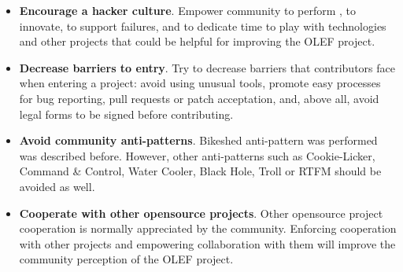 \documentclass[11pt]{article}
\begin{document}
\begin{itemize}
\item{\textbf{Encourage a hacker culture}}. Empower community to perform , to innovate, to support failures, and to dedicate time to play with technologies and other projects that could be helpful for improving the OLEF project.
\item{\textbf{Decrease barriers to entry}}. Try to decrease barriers that contributors face when entering a project: avoid using unusual tools, promote easy processes for bug reporting, pull requests or patch acceptation, and, above all, avoid legal forms to be signed before contributing.
\item{\textbf{Avoid community anti-patterns}}. Bikeshed anti-pattern was performed was described before. However, other anti-patterns such as Cookie-Licker, Command \& Control, Water Cooler, Black Hole, Troll or RTFM should be avoided as well.
\item{\textbf{Cooperate with other opensource projects}}. Other opensource project cooperation is normally appreciated by the community. Enforcing cooperation with other projects and empowering collaboration with them will improve the community perception of the OLEF project.
\end{itemize}
\end{document}
